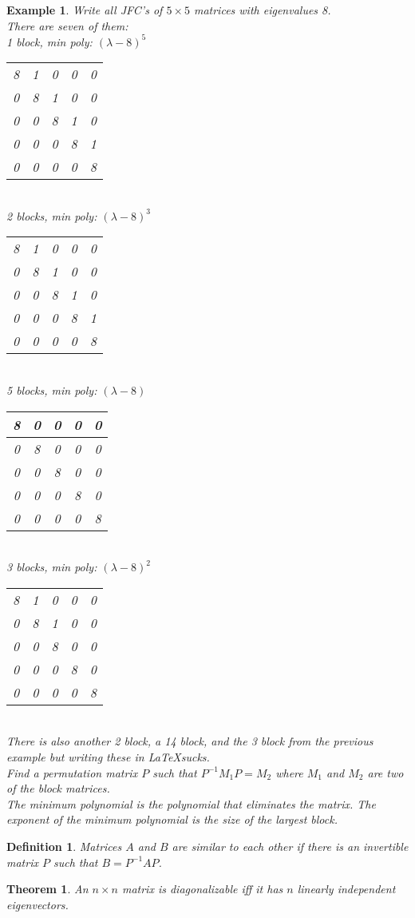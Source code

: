\documentclass{report}
\newtheorem*{ex}{Example}
\newtheorem*{defn}{Definition}
\newtheorem*{thrm}{Theorem}
\begin{document}
\begin{ex}
Write all JFC's of $5\times 5$ matrices with eigenvalues 8.\\
There are seven of them:\\
1 block, min poly: $(\lambda-8)^5$
\begin{tabular}{ccccc}
8&1&0&0&0\\
0&8&1&0&0\\
0&0&8&1&0\\
0&0&0&8&1\\
0&0&0&0&8\\
\end{tabular}\\
2 blocks, min poly: $(\lambda-8)^3$
\begin{tabular}{cccc|c}
8&1&0&0&0\\
0&8&1&0&0\\
0&0&8&1&0\\
\hline
0&0&0&8&1\\
0&0&0&0&8\\
\end{tabular}\\
5 blocks, min poly: $(\lambda-8)$
\begin{tabular}{c|c|c|c|c}
8&0&0&0&0\\
\hline
0&8&0&0&0\\
\hline
0&0&8&0&0\\
\hline
0&0&0&8&0\\
\hline
0&0&0&0&8\\
\end{tabular}\\
3 blocks, min poly: $(\lambda-8)^2$
\begin{tabular}{ccc|c|c}
8&1&0&0&0\\
0&8&1&0&0\\
0&0&8&0&0\\
\hline
0&0&0&8&0\\
\hline
0&0&0&0&8\\
\end{tabular}\\
There is also another 2 block, a 14 block, and the 3 block from the previous example but writing these in \LaTeX sucks.\\
Find a permutation matrix $P$ such that $P^{-1}M_1P=M_2$ where $M_1$ and $M_2$ are two of the block matrices.\\
The minimum polynomial is the polynomial that eliminates the matrix. The exponent of the minimum polynomial is the size of the largest block.\\
\end{ex}
\begin{defn}
Matrices $A$ and $B$ are similar to each other if there is an invertible matrix $P$ such that $B=P^{-1}AP$.
\end{defn}
\begin{thrm}
An $n\times n$ matrix is diagonalizable iff it has $n$ linearly independent eigenvectors.
\end{thrm}
\end{document}
